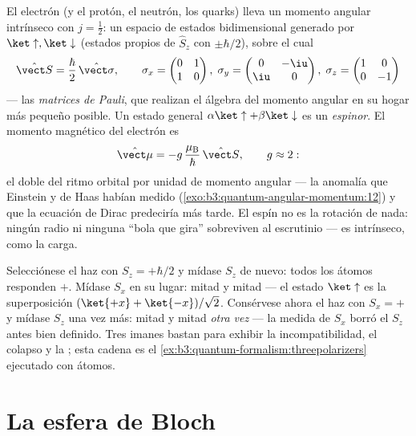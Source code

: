 \begin{definition}\label{def:b3:spin-two-level:spin}
El electrón (y el protón, el neutrón, los quarks) lleva un
momento angular intrínseco con $j = \tfrac12$: un espacio de estados
bidimensional generado por $\ket\uparrow, \ket\downarrow$ (estados propios
de $\hat S_z$ con $\pm\hbar/2$), sobre el cual
\[
\hat{\vect S} = \frac\hbar2\,\hat{\vect\sigma} , \qquad
\sigma_x = \begin{pmatrix}0&1\\1&0\end{pmatrix} ,\;
\sigma_y = \begin{pmatrix}0&-\iu\\\iu&0\end{pmatrix} ,\;
\sigma_z = \begin{pmatrix}1&0\\0&-1\end{pmatrix}
\]
--- las \emph{matrices de Pauli}, que realizan el álgebra del momento
angular en su hogar más pequeño posible. Un estado general
$\alpha\ket\uparrow + \beta\ket\downarrow$ es un \emph{espinor}. El
momento magnético del electrón es
\[
\hat{\vect\mu} = -g\,\frac{\mu_{\text{B}}}{\hbar}\,\hat{\vect S} ,
\qquad g \approx 2 :
\]
el doble del ritmo orbital por unidad de momento angular --- la anomalía que
Einstein y de Haas habían medido
(\cref{exo:b3:quantum-angular-momentum:12}) y que la ecuación de Dirac
predeciría más tarde. El espín no es la rotación de nada: ningún radio ni
ninguna ``bola que gira'' sobreviven al escrutinio --- es intrínseco, como
la carga.
\end{definition}

\begin{example}\label{ex:b3:spin-two-level:chained}
Selecciónese el haz con $S_z = +\hbar/2$ y mídase $S_z$ de nuevo: todos los
átomos responden $+$. Mídase $S_x$ en su lugar: mitad y mitad --- el estado
$\ket\uparrow$ es la superposición $(\ket{+x} + \ket{-x})/\sqrt2$.
Consérvese ahora el haz con $S_x = +$ y mídase $S_z$ una vez más: mitad y
mitad \emph{otra vez} --- la medida de $S_x$ borró el $S_z$ antes bien
definido. Tres imanes bastan para exhibir la incompatibilidad, el
colapso y la ; esta cadena es el
\cref{ex:b3:quantum-formalism:threepolarizers} ejecutado con átomos.
\end{example}

\section{La esfera de Bloch}

